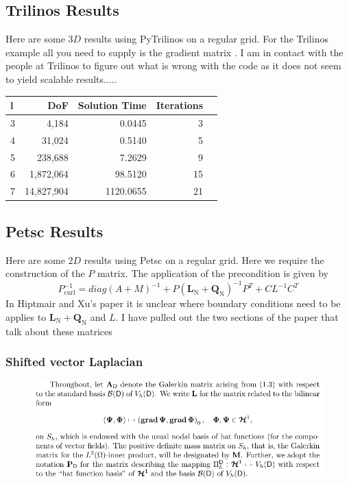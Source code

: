 \documentclass{article}
\begin{document}
\subsection*{Trilinos Results}

Here are some $3D$ results using PyTrilinos on a regular grid. For the Trilinos example all you need to supply is the gradient matrix . I am in contact with the people at Trilinos to figure out what is wrong with the code as it does not seem to yield scalable results.....

\begin{tabular}{lrrrr}
\hline
 l &   DoF &   Solution  Time &  Iterations \\
\hline
 3 &     4,184 &   0.0445 &           3 \\
 4 &    31,024 &   0.5140 &           5 \\
 5 &   238,688 &   7.2629 &           9 \\
 6 &  1,872,064 &  98.5120 &          15 \\
 7 & 14,827,904 & 1120.0655 & 21\\
\hline
\end{tabular}


\subsection*{Petsc Results}

Here are some $2D$ results using Petsc on a regular grid. Here we require the construction of the $P$ matrix. The application of the precondition is given by
$$P_{\mbox{curl}}^{-1} = diag(A+M)^{-1} + P (\textbf{L}_{\mbox{N}}+\textbf{Q}_{\mbox{N}})^{-1}P^T+CL^{-1}C^T$$
In Hiptmair and Xu's paper it is unclear where boundary conditions need to be applies to $\textbf{L}_{\mbox{N}}+\textbf{Q}_{\mbox{N}}$ and $L$. I have pulled out the two sections of the paper that talk about these matrices
\subsubsection*{Shifted vector Laplacian}
\begin{figure}[h!]
    \centering
    \includegraphics[width=1\textwidth]{Figures/VectorLaplacian.png}
    \caption{}
    \label{fig:121}
\end{figure}
\end{document}

